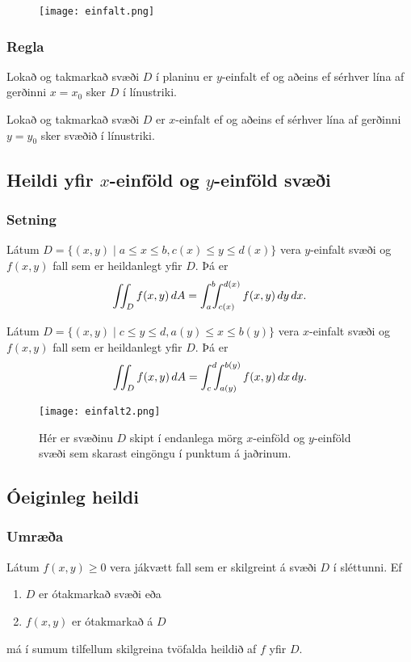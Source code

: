 \begin {figure}[h!]
 \centering
            \texttt{[image: einfalt.png]}
            \caption*{}
\end {figure}



\subsubsection{Regla }
Lokað og takmarkað svæði $D$ í planinu er $y$-einfalt ef og aðeins ef sérhver lína af gerðinni $x=x_0$ sker $D$ í línustriki.  

\medskip
Lokað og takmarkað svæði $D$ er $x$-einfalt ef og aðeins ef sérhver lína af gerðinni $y=y_0$ sker svæðið í línustriki.



\subsection{Heildi yfir $x$-einföld og $y$-einföld svæði} 

\subsubsection{Setning }
Látum 
$D=\{(x,y)\mid a\leq x\leq b, c(x)\leq y\leq d(x)\}$
vera $y$-einfalt svæði og $f(x,y)$ fall sem er heildanlegt yfir $D$.  Þá er 
$$\int\!\!\!\int_D f(x,y)\,dA=\int_a^b\!\!\!\int_{c(x)}^{d(x)}f(x,y)\,dy\, dx.$$


\medskip
Látum 
$D=\{(x,y)\mid c\leq y\leq d, a(y)\leq x\leq b(y)\}$
vera $x$-einfalt svæði og $f(x,y)$ fall sem er heildanlegt yfir $D$.  Þá er 
$$\int\!\!\!\int_D f(x,y)\,dA=\int_c^d\!\!\!\int_{a(y)}^{b(y)}f(x,y)\,dx\, dy.$$



 \begin {figure}[h!]
 \centering
            \texttt{[image: einfalt2.png]}
            \caption*{Hér er svæðinu $D$ skipt í endanlega mörg $x$-einföld og $y$-einföld svæði sem skarast eingöngu í punktum á jaðrinum.}
\end {figure}



\subsection{Óeiginleg heildi}
 \subsubsection{Umræða }
  Látum $f(x,y)\geq 0$ vera jákvætt fall sem er skilgreint á svæði $D$ í sléttunni. Ef
  \begin {enumerate}
   \item $D$ er ótakmarkað svæði eða
   \item $f(x,y)$ er ótakmarkað á $D$
  \end {enumerate}
má í sumum tilfellum skilgreina tvöfalda heildið af $f$ yfir $D$.

